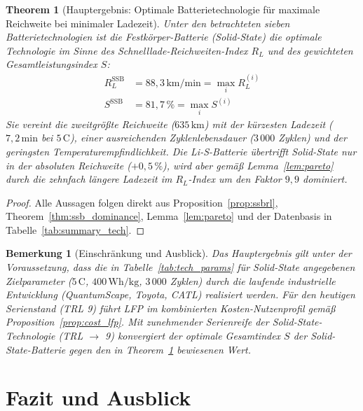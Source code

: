 ﻿\documentclass[12pt,a4paper]{article}
\newtheorem{theorem}{Theorem}[section]
\newtheorem{remark}{Bemerkung}[section]
\begin{document}
	\begin{theorem}[Hauptergebnis: Optimale Batterietechnologie für maximale
	               Reichweite bei minimaler Ladezeit]
		\label{thm:main_result}
		Unter den betrachteten sieben Batterietechnologien ist die
		\emph{Festkörper-Batterie (Solid-State)} die optimale Technologie
		im Sinne des Schnelllade-Reichweiten-Index $R_L$ und des
		gewichteten Gesamtleistungsindex $S$:
		\begin{align}
			R_L^{\mathrm{SSB}} &= 88{,}3\,\mathrm{km/min} =
			\max_i R_L^{(i)}
			\label{eq:main_rl} \\
			S^{\mathrm{SSB}} &= 81{,}7\,\% =
			\max_i S^{(i)}
			\label{eq:main_s}
		\end{align}
		Sie vereint die zweitgrößte Reichweite ($635\,\mathrm{km}$) mit
		der kürzesten Ladezeit ($7{,}2\,\mathrm{min}$ bei $5\,\mathrm{C}$),
		einer ausreichenden Zyklenlebensdauer ($3\,000$ Zyklen) und der
		geringsten Temperaturempfindlichkeit. Die Li-S-Batterie übertrifft
		Solid-State nur in der absoluten Reichweite ($+0{,}5\,\%$), wird
		aber gemäß Lemma~\ref{lem:pareto} durch die zehnfach längere
		Ladezeit im $R_L$-Index um den Faktor $9{,}9$ dominiert.
	\end{theorem}

	\begin{proof}
		Alle Aussagen folgen direkt aus Proposition~\ref{prop:ssbrl},
		Theorem~\ref{thm:ssb_dominance}, Lemma~\ref{lem:pareto} und
		der Datenbasis in Tabelle~\ref{tab:summary_tech}.
	\end{proof}

	\begin{remark}[Einschränkung und Ausblick]
		Das Hauptergebnis gilt unter der Voraussetzung, dass die in
		Tabelle~\ref{tab:tech_params} für Solid-State angegebenen
		Zielparameter ($5\,\mathrm{C}$, $400\,\mathrm{Wh/kg}$,
		$3\,000$ Zyklen) durch die laufende industrielle Entwicklung
		(QuantumScape, Toyota, CATL) realisiert werden. Für den heutigen
		Serienstand (TRL 9) führt LFP im kombinierten Kosten-Nutzenprofil
		gemäß Proposition~\ref{prop:cost_lfp}. Mit zunehmender
		Serienreife der Solid-State-Technologie (TRL $\to$ 9) konvergiert
		der optimale Gesamtindex $S$ der Solid-State-Batterie gegen den
		in Theorem~\ref{thm:main_result} bewiesenen Wert.
	\end{remark}

	\section{Fazit und Ausblick}
	\label{sec:fazit}
\end{document}
